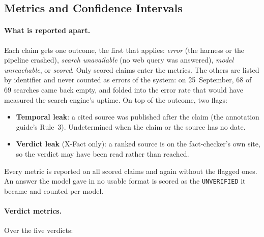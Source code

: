 
\subsection{Metrics and Confidence Intervals}
\label{subsec:harness-metrics}

\paragraph{What is reported apart.} Each claim gets one outcome, the
first that applies: \emph{error} (the harness or the pipeline crashed),
\emph{search unavailable} (no web query was answered),
\emph{model unreachable}, or \emph{scored}. Only scored claims enter
the metrics. The others are listed by identifier and never counted as
errors of the system: on 25~September, 68 of 69 searches came back
empty, and folded into the error rate that would have measured the
search engine's uptime. On top of the outcome, two flags:

\begin{itemize}
    \item \textbf{Temporal leak}: a cited source was published after
    the claim (the annotation guide's Rule~3). Undetermined when the
    claim or the source has no date.
    \item \textbf{Verdict leak} (X-Fact only): a ranked source is on the
    fact-checker's own site, so the verdict may have been read rather
    than reached.
\end{itemize}

Every metric is reported on all scored claims and again without the
flagged ones. An answer the model gave in no usable format is scored as
the \texttt{UNVERIFIED} it became and counted per model.

\paragraph{Verdict metrics.} Over the five verdicts:

